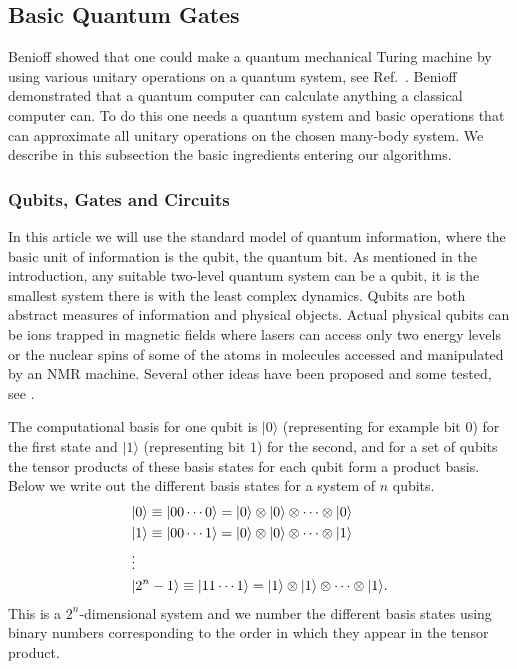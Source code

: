 \subsection{Basic Quantum  Gates}

Benioff showed that one could make a quantum mechanical Turing machine
by using various  unitary operations on a quantum system, see Ref.~\cite{benioff1980}.
Benioff  demonstrated 
that a quantum computer can calculate anything a
classical computer can. To do this one needs a quantum system and
basic operations that can approximate all unitary operations
on the chosen many-body system. We describe in this subsection the basic ingredients entering 
our algorithms.

\subsubsection{Qubits, Gates and Circuits}
\label{sec:gates}
In this article we will use the standard model of quantum information,
where
the basic unit of information is the qubit, the quantum bit. 
As mentioned in the introduction, any
suitable 
two-level quantum system can be a qubit, 
it is the smallest system there is with the
least complex dynamics.
Qubits are both abstract measures of information and physical objects.
Actual physical qubits can be ions trapped in magnetic fields where
lasers can access only two energy levels or  the nuclear spins of some of
the atoms in molecules accessed and manipulated by an NMR machine.
Several other ideas have been proposed and some tested, see
\cite{nielsen2000}. 

The computational basis for one qubit is ${\ensuremath{|0\rangle}}$ (representing for example bit $0$) 
for the first state
and ${\ensuremath{|1\rangle}}$ (representing bit $1$) for the second, and for a set of qubits  
the tensor products of
these basis states for each qubit form a product basis. Below we write out the different
basis states for a system of $n$ qubits.
\begin{eqnarray}
\label{eq:compBasis}
&{\ensuremath{|0\rangle}} \equiv {\ensuremath{|00\cdots 0\rangle}} =
      {\ensuremath{|0\rangle}} \otimes {\ensuremath{| 0\rangle}} \otimes
          \cdots 
\otimes {\ensuremath{|0\rangle}} 
\notag \\
&{\ensuremath{|1\rangle}} \equiv {\ensuremath{|00\cdots 1\rangle}} =
    {\ensuremath{|0\rangle}} \otimes {\ensuremath{| 0\rangle}} \otimes
        \cdots 
\otimes {\ensuremath{|1\rangle}} 
\notag \\
&\vdots \notag \\
&{\ensuremath{|2^n-1\rangle}} \equiv {\ensuremath{|11\cdots 1\rangle}} =
    {\ensuremath{|1\rangle}} \otimes {\ensuremath{| 1\rangle}} \otimes 
\cdots \otimes {\ensuremath{|1 \rangle}}.
\notag \\
\end{eqnarray}
This is a $2^n$-dimensional system and we number the different basis
states using binary numbers corresponding to the order in which they appear in the
tensor product.

